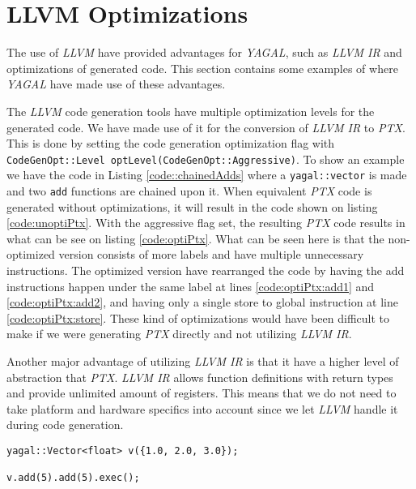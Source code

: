 \section{LLVM Optimizations}

The use of \textit{LLVM} have provided advantages for \textit{YAGAL}, such as \textit{LLVM IR} and optimizations of generated code. This section contains some examples of where \textit{YAGAL} have made use of these advantages.

The \textit{LLVM} code generation tools have multiple optimization levels for the generated code. We have made use of it for the conversion of \textit{LLVM IR} to \textit{PTX}. This is done by setting the code generation optimization flag with \texttt{CodeGenOpt::Level optLevel(CodeGenOpt::Aggressive)}. To show an example we have the code in Listing \ref{code::chainedAdds} where a \texttt{yagal::vector} is made and two \texttt{add} functions are chained upon it. When equivalent \textit{PTX} code is generated without optimizations, it will result in the code shown on listing \ref{code:unoptiPtx}. With the aggressive flag set, the resulting \textit{PTX} code results in what can be see on listing \ref{code:optiPtx}. 
What can be seen here is that the non-optimized version consists of more labels and have multiple unnecessary instructions. The optimized version have rearranged the code by having the add instructions happen under the same label at lines \ref{code:optiPtx:add1} and \ref{code:optiPtx:add2}, and having only a single store to global instruction at line \ref{code:optiPtx:store}. These kind of optimizations would have been difficult to make if we were generating \textit{PTX} directly and not utilizing \textit{LLVM IR}.

Another major advantage of utilizing \textit{LLVM IR} is that it have a higher level of abstraction that \textit{PTX}. \textit{LLVM IR} allows function definitions with return types and provide unlimited amount of registers. This means that we do not need to take platform and hardware specifics into account since we let \textit{LLVM} handle it during code generation.

\begin{lstlisting}[caption={Chained \texttt{yagal::vector::add}}, label={code::chainedAdds}]
yagal::Vector<float> v({1.0, 2.0, 3.0});

v.add(5).add(5).exec();
\end{lstlisting}

